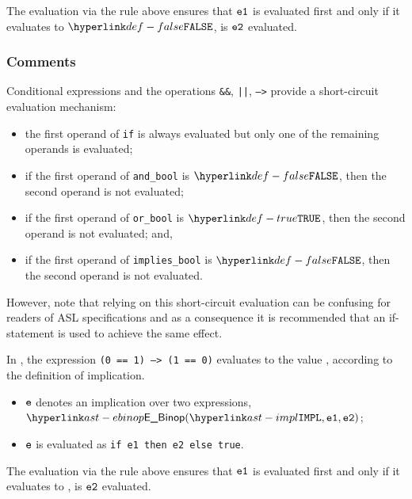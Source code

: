 The evaluation via the rule above ensures that $\veone$ is evaluated first and only if
it evaluates to $\False$, is $\vetwo$ evaluated.

\subsubsection{Comments}

Conditional expressions and the operations \texttt{\&\&}, \texttt{||},
\texttt{-->} provide a short-circuit evaluation mechanism:

\begin{itemize}
\item the first operand of \texttt{if} is always evaluated but only one of the
remaining operands is evaluated;
\item if the first operand of \texttt{and\_bool} is $\False$, then the second operand is not evaluated;
\item if the first operand of \texttt{or\_bool} is $\True$, then the second operand is not evaluated; and,
\item if the first operand of \texttt{implies\_bool} is $\False$, then the
second operand is not evaluated.
\end{itemize}

However, note that relying on this short-circuit evaluation can be confusing
for readers of ASL specifications and as a consequence it is recommended that
an if-statement is used to achieve the same effect.

In ,
the expression \texttt{(0 == 1) --> (1 == 0)} evaluates to the value \True, according to the definition of implication.

\ProseParagraph
\AllApply
\begin{itemize}
  \item $\ve$ denotes an implication over two expressions, $\EBinop(\IMPL, \veone, \vetwo)$;
  \item $\ve$ is evaluated as \texttt{if e1 then e2 else true}.
\end{itemize}

\FormallyParagraph
\begin{mathpar}
\end{mathpar}
The evaluation via the rule above ensures that $\veone$ is evaluated first and only if
it evaluates to \True, is $\vetwo$ evaluated.

